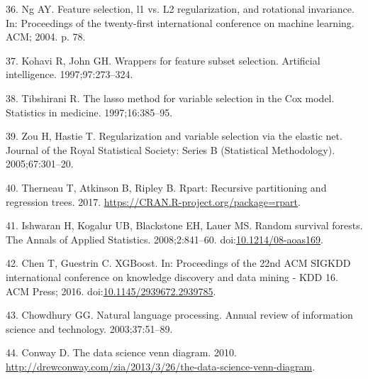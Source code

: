 \documentclass[12pt,oneside]{reedthesis}
\theoremstyle{definition}
\theoremstyle{definition}
\theoremstyle{definition}
\theoremstyle{remark}
\begin{document}
\leavevmode\hypertarget{ref-Ng_2004}{}%
36. Ng AY. Feature selection, l1 vs. L2 regularization, and rotational
invariance. In: Proceedings of the twenty-first international conference
on machine learning. ACM; 2004. p. 78.

\leavevmode\hypertarget{ref-Kohavi_1997}{}%
37. Kohavi R, John GH. Wrappers for feature subset selection. Artificial
intelligence. 1997;97:273--324.

\leavevmode\hypertarget{ref-Tibshirani_1997}{}%
38. Tibshirani R. The lasso method for variable selection in the Cox
model. Statistics in medicine. 1997;16:385--95.

\leavevmode\hypertarget{ref-Zou_2005}{}%
39. Zou H, Hastie T. Regularization and variable selection via the
elastic net. Journal of the Royal Statistical Society: Series B
(Statistical Methodology). 2005;67:301--20.

\leavevmode\hypertarget{ref-rpart_2017}{}%
40. Therneau T, Atkinson B, Ripley B. Rpart: Recursive partitioning and
regression trees. 2017. \url{https://CRAN.R-project.org/package=rpart}.

\leavevmode\hypertarget{ref-Ishwaran_2008}{}%
41. Ishwaran H, Kogalur UB, Blackstone EH, Lauer MS. Random survival
forests. The Annals of Applied Statistics. 2008;2:841--60.
doi:\href{https://doi.org/10.1214/08-aoas169}{10.1214/08-aoas169}.

\leavevmode\hypertarget{ref-Chen_2016}{}%
42. Chen T, Guestrin C. XGBoost. In: Proceedings of the 22nd ACM SIGKDD
international conference on knowledge discovery and data mining - KDD
16. ACM Press; 2016.
doi:\href{https://doi.org/10.1145/2939672.2939785}{10.1145/2939672.2939785}.

\leavevmode\hypertarget{ref-Chowdhury_2003}{}%
43. Chowdhury GG. Natural language processing. Annual review of
information science and technology. 2003;37:51--89.

\leavevmode\hypertarget{ref-Conway_2010}{}%
44. Conway D. The data science venn diagram. 2010.
\url{http://drewconway.com/zia/2013/3/26/the-data-science-venn-diagram}.


\end{document}
